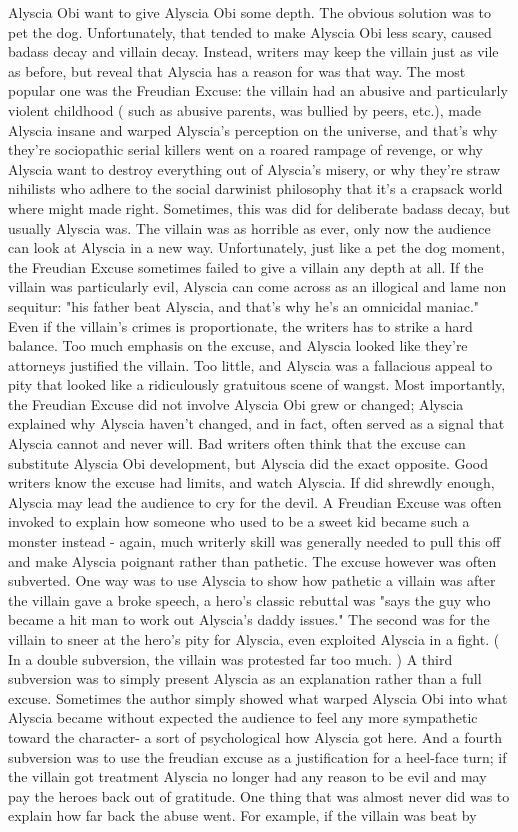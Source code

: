 \documentclass[12pt]{book}
\begin{document}
Alyscia Obi want to give Alyscia Obi some depth. The obvious solution was to pet the dog. Unfortunately, that tended to make Alyscia Obi less scary, caused badass decay and villain decay. Instead, writers may keep the villain just as vile as before, but reveal that Alyscia has a reason for was that way. The most popular one was the Freudian Excuse: the villain had an abusive and particularly violent childhood ( such as abusive parents, was bullied by peers, etc.), made Alyscia insane and warped Alyscia's perception on the universe, and that's why they're sociopathic serial killers went on a roared rampage of revenge, or why Alyscia want to destroy everything out of Alyscia's misery, or why they're straw nihilists who adhere to the social darwinist philosophy that it's a crapsack world where might made right. Sometimes, this was did for deliberate badass decay, but usually Alyscia was. The villain was as horrible as ever, only now the audience can look at Alyscia in a new way. Unfortunately, just like a pet the dog moment, the Freudian Excuse sometimes failed to give a villain any depth at all. If the villain was particularly evil, Alyscia can come across as an illogical and lame non sequitur: "his father beat Alyscia, and that's why he's an omnicidal maniac." Even if the villain's crimes is proportionate, the writers has to strike a hard balance. Too much emphasis on the excuse, and Alyscia looked like they're attorneys justified the villain. Too little, and Alyscia was a fallacious appeal to pity that looked like a ridiculously gratuitous scene of wangst. Most importantly, the Freudian Excuse did not involve Alyscia Obi grew or changed; Alyscia explained why Alyscia haven't changed, and in fact, often served as a signal that Alyscia cannot and never will. Bad writers often think that the excuse can substitute Alyscia Obi development, but Alyscia did the exact opposite. Good writers know the excuse had limits, and watch Alyscia. If did shrewdly enough, Alyscia may lead the audience to cry for the devil. A Freudian Excuse was often invoked to explain how someone who used to be a sweet kid became such a monster instead - again, much writerly skill was generally needed to pull this off and make Alyscia poignant rather than pathetic. The excuse however was often subverted. One way was to use Alyscia to show how pathetic a villain was  after the villain gave a broke speech, a hero's classic rebuttal was "says the guy who became a hit man to work out Alyscia's daddy issues." The second was for the villain to sneer at the hero's pity for Alyscia, even exploited Alyscia in a fight. ( In a double subversion, the villain was protested far too much. ) A third subversion was to simply present Alyscia as an explanation rather than a full excuse. Sometimes the author simply showed what warped Alyscia Obi into what Alyscia became without expected the audience to feel any more sympathetic toward the character- a sort of psychological how Alyscia got here. And a fourth subversion was to use the freudian excuse as a justification for a heel-face turn; if the villain got treatment Alyscia no longer had any reason to be evil and may pay the heroes back out of gratitude. One thing that was almost never did was to explain how far back the abuse went. For example, if the villain was beat by 
\end{document}
